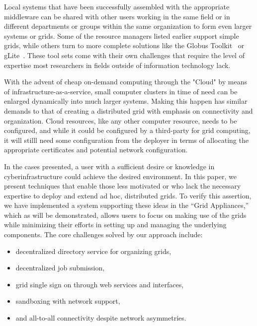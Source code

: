 \documentclass[conference]{IEEEtran}
\begin{document}
Local systems that have been successfully assembled with the appropriate
middleware can be shared with other users working in the same field or in
different departments or groups within the same organization to form even
larger systems or grids.  Some of the resource managers listed earlier support
simple grids, while others turn to more complete solutions like the Globus
Toolkit~\cite{globus} or gLite~\cite{glite}.  These tool sets come with their
own challenges that require the level of expertise most researchers in fields
outside of information technology lack.

With the advent of cheap on-demand computing through the "Cloud" by means of
infrastructure-as-a-service, small computer clusters in time of need can be
enlarged dynamically into much larger systems.  Making this happen has similar
demands to that of creating a distributed grid with emphasis on connectivity
and organization.  Cloud resources, like any other computer resource, needs to
be configured, and while it could be configured by a third-party for grid
computing, it will stilll need some configuration from the deployer in terms of
allocating the appropriate certificates and potential network configuration.

In the cases presented, a user with a sufficient desire or knowledge in
cyberinfrastructure could achieve the desired environment.  In this paper, we
present techniques that enable those less motivated or who lack the necessary
expertise to deploy and extend ad hoc, distributed grids.  To verify this
assertion, we have implemented a system supporting these ideas in the ``Grid
Appliances,'' which as will be demonstrated, allows users to focus on making
use of the grids while minimizing their efforts in setting up and managing the
underlying components.  The core challenges solved by our approach include:
\begin{itemize}
\item decentralized directory service for organizing grids,
\item decentralized job submission,
\item grid single sign on through web services and interfaces,
\item sandboxing with network support,
\item and all-to-all connectivity despite network asymmetries.
\end{itemize}
\end{document}
